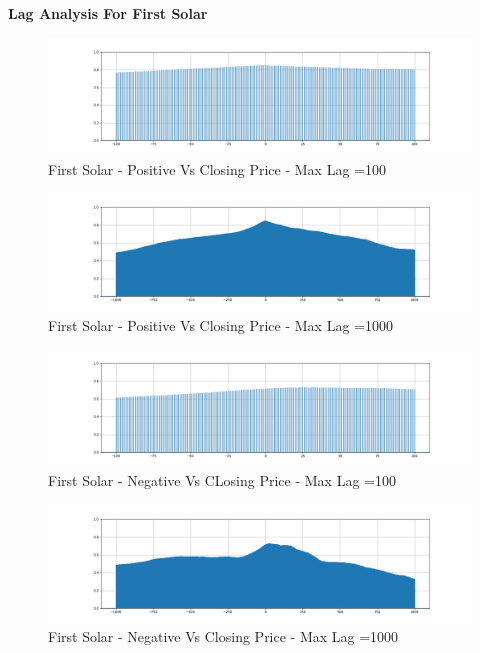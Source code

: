\documentclass[sigconf, nonacm]{acmart}
\begin{document}
\textbf{Lag Analysis For First Solar}
\newline
\begin{figure}[H]
  \centering
  \includegraphics[width=\linewidth]{images/fslr_100_pos.png}
  \caption{First Solar - Positive Vs Closing Price - Max Lag =100}
\end{figure}

\begin{figure}[H]
  \centering
  \includegraphics[width=\linewidth]{images/fslr_1000_pos.png}
  \caption{First Solar - Positive Vs Closing Price - Max Lag =1000}
\end{figure}




\begin{figure}[H]
  \centering
  \includegraphics[width=\linewidth]{images/fslr_100_neg.png}
  \caption{First Solar - Negative Vs CLosing Price - Max Lag =100}
\end{figure}

\begin{figure}[H]
  \centering
  \includegraphics[width=\linewidth]{images/fslr_1000_neg.png}
  \caption{First Solar - Negative Vs Closing Price - Max Lag =1000}
\end{figure}
\end{document}
